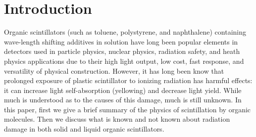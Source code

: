 \section{Introduction}
Organic scintillators (such as
toluene, polystyrene, and naphthalene) containing wave-length shifting
additives in solution
have long been popular elements in detectors used
in particle physics, nuclear physics, radiation safety, and heath physics applications
 due to their high light output, low cost, fast response,
and versatility of physical construction.  
However, it has long
been know that prolonged exposure of plastic scintillator to
ionizing radiation has harmful effects: it can increase
light self-absorption (yellowing) and  decrease
light yield.  
While much is understood as to the causes of this damage,
much is still unknown.
In this paper, first we give a brief summary of the physics
of scintillation by organic molecules.  Then we discuss what is known and
not known about radiation damage in both solid and liquid organic
scintillators.  



